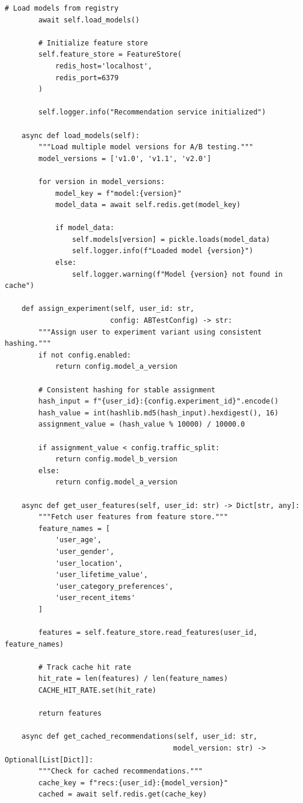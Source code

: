 \begin{lstlisting}[style=python, caption=FastAPI Serving with A/B Testing]
        # Load models from registry
        await self.load_models()

        # Initialize feature store
        self.feature_store = FeatureStore(
            redis_host='localhost',
            redis_port=6379
        )

        self.logger.info("Recommendation service initialized")

    async def load_models(self):
        """Load multiple model versions for A/B testing."""
        model_versions = ['v1.0', 'v1.1', 'v2.0']

        for version in model_versions:
            model_key = f"model:{version}"
            model_data = await self.redis.get(model_key)

            if model_data:
                self.models[version] = pickle.loads(model_data)
                self.logger.info(f"Loaded model {version}")
            else:
                self.logger.warning(f"Model {version} not found in cache")

    def assign_experiment(self, user_id: str,
                         config: ABTestConfig) -> str:
        """Assign user to experiment variant using consistent hashing."""
        if not config.enabled:
            return config.model_a_version

        # Consistent hashing for stable assignment
        hash_input = f"{user_id}:{config.experiment_id}".encode()
        hash_value = int(hashlib.md5(hash_input).hexdigest(), 16)
        assignment_value = (hash_value % 10000) / 10000.0

        if assignment_value < config.traffic_split:
            return config.model_b_version
        else:
            return config.model_a_version

    async def get_user_features(self, user_id: str) -> Dict[str, any]:
        """Fetch user features from feature store."""
        feature_names = [
            'user_age',
            'user_gender',
            'user_location',
            'user_lifetime_value',
            'user_category_preferences',
            'user_recent_items'
        ]

        features = self.feature_store.read_features(user_id, feature_names)

        # Track cache hit rate
        hit_rate = len(features) / len(feature_names)
        CACHE_HIT_RATE.set(hit_rate)

        return features

    async def get_cached_recommendations(self, user_id: str,
                                        model_version: str) -> Optional[List[Dict]]:
        """Check for cached recommendations."""
        cache_key = f"recs:{user_id}:{model_version}"
        cached = await self.redis.get(cache_key)


\end{lstlisting}

